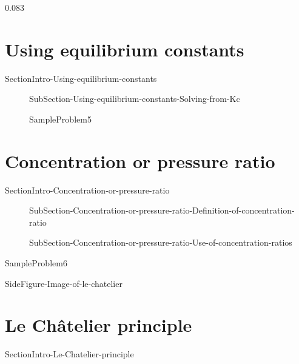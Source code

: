 0.083\documentclass[main.tex]{subfiles}
\newcommand\chapterlabel{Ch-equilibrium}\setcounter{figurenewcounter}{0}\setcounter{tablenewcounter}{0}\setcounter{formulanewcounter}{0}
\begin{document}
\section{ {Using equilibrium constants}}   {SectionIntro-Using-equilibrium-constants}



   
   \sloppy
\begin{description}
\item[]{SubSection-Using-equilibrium-constants-Solving-from-Kc}



  {SampleProblem5}
\end{description}
 



\section{ Concentration or pressure ratio}
   {SectionIntro-Concentration-or-pressure-ratio}
\sloppy\begin{description}

\item[] {SubSection-Concentration-or-pressure-ratio-Definition-of-concentration-ratio}



\item[] {SubSection-Concentration-or-pressure-ratio-Use-of-concentration-ratios}


\end{description}
  {SampleProblem6}










{SideFigure-Image-of-le-chatelier}

\section{ {Le Ch\^{a}telier principle}}
   {SectionIntro-Le-Chatelier-principle}
\end{document}
